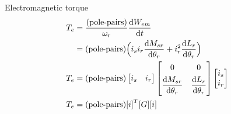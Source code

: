 \documentclass[a4paper,numbers=noenddot,12pt]{scrbook}
\begin{document}
Electromagnetic torque
\begin{align}
    T_e & = \frac{(\text{pole-pairs})}{\omega_r} \frac{\dif W_{em}}{\dif t} \nonumber\\
    & =  (\text{pole-pairs})\Big(i_s i_r \frac{\dif M_{sr}}{\dif \theta_r}  + i_r^2 \frac{\dif L_r}{\dif \theta_r} \Big) \nonumber \\
    T_e & = (\text{pole-pairs})
    \begin{bmatrix}
        i_s & i_r
    \end{bmatrix}
    \begin{bmatrix}
        0 & 0 \\[1ex]
        \dfrac{\dif M_{sr}}{\dif \theta_r} & \dfrac{\dif L_{r}}{\dif \theta_r} 
    \end{bmatrix}
    \begin{bmatrix}
        i_s \\ i_r
    \end{bmatrix} \\
    T_e &= (\text{pole-pairs}) {[i]}^T[G][i] &
\end{align}
\end{document}

